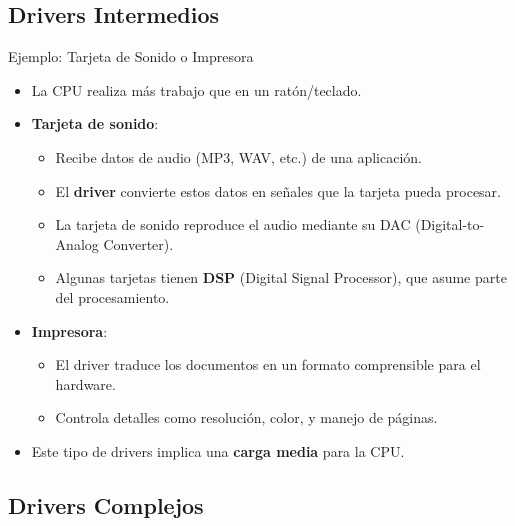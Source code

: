 \documentclass{beamer}
\begin{document}
\subsection{Drivers Intermedios}

\begin{frame}{Ejemplo: Tarjeta de Sonido o Impresora}
    \begin{itemize}
        \item La CPU realiza más trabajo que en un ratón/teclado.
        \item \textbf{Tarjeta de sonido}:
            \begin{itemize}
                \item Recibe datos de audio (MP3, WAV, etc.) de una aplicación.
                \item El \textbf{driver} convierte estos datos en señales que la tarjeta pueda procesar.
                \item La tarjeta de sonido reproduce el audio mediante su DAC (Digital-to-Analog Converter).
                \item Algunas tarjetas tienen \textbf{DSP} (Digital Signal Processor), que asume parte del procesamiento.
            \end{itemize}
        \item \textbf{Impresora}:
            \begin{itemize}
                \item El driver traduce los documentos en un formato comprensible para el hardware.
                \item Controla detalles como resolución, color, y manejo de páginas.
            \end{itemize}
        \item Este tipo de drivers implica una \textbf{carga media} para la CPU.
    \end{itemize}
\end{frame}

\subsection{Drivers Complejos}
\end{document}
